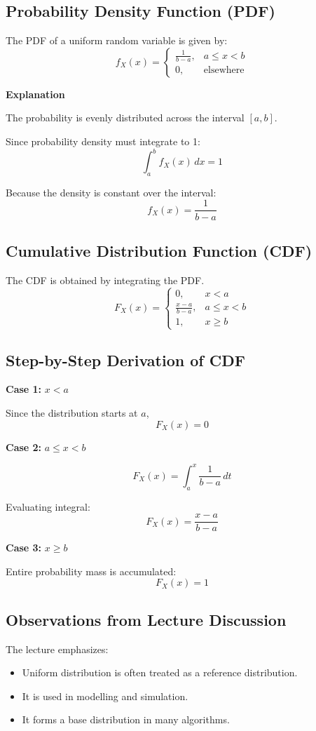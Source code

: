 \documentclass[12pt]{article}
\begin{document}
\subsection{Probability Density Function (PDF)}
The PDF of a uniform random variable is given by:
\[
f_X(x) =
\begin{cases}
\frac{1}{b-a}, & a \leq x < b \\
0, & \text{elsewhere}
\end{cases}
\]

\textbf{Explanation}

The probability is evenly distributed across the interval $[a,b]$.

Since probability density must integrate to 1:
\[
\int_a^b f_X(x)\,dx = 1
\]

Because the density is constant over the interval:
\[
f_X(x) = \frac{1}{b-a}
\]

\subsection{Cumulative Distribution Function (CDF)}
The CDF is obtained by integrating the PDF.
\[
F_X(x) =
\begin{cases}
0, & x < a \\
\frac{x-a}{b-a}, & a \leq x < b \\
1, & x \geq b
\end{cases}
\]

\subsection{Step-by-Step Derivation of CDF}

\textbf{Case 1:} $x < a$

Since the distribution starts at $a$,
\[
F_X(x) = 0
\]

\textbf{Case 2:} $a \leq x < b$

\[
F_X(x) = \int_a^x \frac{1}{b-a} \, dt
\]

Evaluating integral:
\[
F_X(x) = \frac{x-a}{b-a}
\]

\textbf{Case 3:} $x \geq b$

Entire probability mass is accumulated:
\[
F_X(x) = 1
\]

\subsection{Observations from Lecture Discussion}
The lecture emphasizes:

\begin{itemize}
\item Uniform distribution is often treated as a reference distribution.
\item It is used in modelling and simulation.
\item It forms a base distribution in many algorithms.
\end{itemize}
\end{document}

